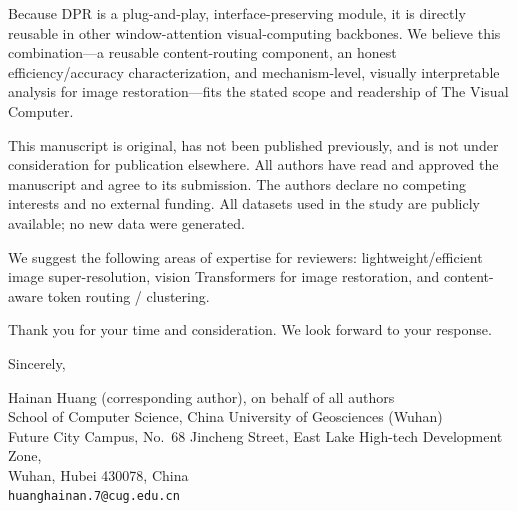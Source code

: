 \documentclass[10pt]{article}
\begin{document}
Because DPR is a plug-and-play, interface-preserving module, it is directly reusable in
other window-attention visual-computing backbones. We believe this combination---a reusable
content-routing component, an honest efficiency/accuracy characterization, and
mechanism-level, visually interpretable analysis for image restoration---fits the stated
scope and readership of The Visual Computer.

This manuscript is original, has not been published previously, and is not under
consideration for publication elsewhere. All authors have read and approved the manuscript
and agree to its submission. The authors declare no competing interests and no external
funding. All datasets used in the study are publicly available; no new data were generated.

We suggest the following areas of expertise for reviewers: lightweight/efficient image
super-resolution, vision Transformers for image restoration, and content-aware token
routing / clustering.

Thank you for your time and consideration. We look forward to your response.

\medskip
\noindent Sincerely,

\medskip
\noindent Hainan Huang (corresponding author), on behalf of all authors \\
School of Computer Science, China University of Geosciences (Wuhan) \\
Future City Campus, No.\ 68 Jincheng Street, East Lake High-tech Development Zone, \\
Wuhan, Hubei 430078, China \\
\texttt{huanghainan.7@cug.edu.cn}
\end{document}
